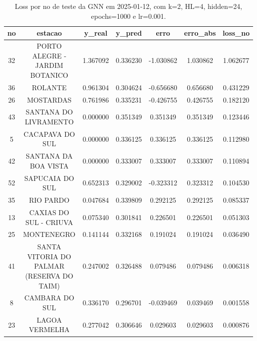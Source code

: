 \begin{table}[h]
\centering
\caption{Loss por no de teste da GNN em 2025-01-12, com k=2, HL=4, hidden=24, epochs=1000 e lr=0.001.}
\label{tab:gnn_loss_k2_hl4_h24_e1000_d20250112}
\begin{tabular}{ccccccc}
\toprule
no & estacao & y\_real & y\_pred & erro & erro\_abs & loss\_no \\
\midrule
32 & PORTO ALEGRE - JARDIM BOTANICO & 1.367092 & 0.336230 & -1.030862 & 1.030862 & 1.062677 \\
36 & ROLANTE & 0.961304 & 0.304624 & -0.656680 & 0.656680 & 0.431229 \\
26 & MOSTARDAS & 0.761986 & 0.335231 & -0.426755 & 0.426755 & 0.182120 \\
43 & SANTANA DO LIVRAMENTO & 0.000000 & 0.351349 & 0.351349 & 0.351349 & 0.123446 \\
5 & CACAPAVA DO SUL & 0.000000 & 0.336125 & 0.336125 & 0.336125 & 0.112980 \\
42 & SANTANA DA BOA VISTA & 0.000000 & 0.333007 & 0.333007 & 0.333007 & 0.110894 \\
52 & SAPUCAIA DO SUL & 0.652313 & 0.329002 & -0.323312 & 0.323312 & 0.104530 \\
35 & RIO PARDO & 0.047684 & 0.339809 & 0.292125 & 0.292125 & 0.085337 \\
13 & CAXIAS DO SUL - CRIUVA & 0.075340 & 0.301841 & 0.226501 & 0.226501 & 0.051303 \\
25 & MONTENEGRO & 0.141144 & 0.332168 & 0.191024 & 0.191024 & 0.036490 \\
41 & SANTA VITORIA DO PALMAR (RESERVA DO TAIM) & 0.247002 & 0.326488 & 0.079486 & 0.079486 & 0.006318 \\
8 & CAMBARA DO SUL & 0.336170 & 0.296701 & -0.039469 & 0.039469 & 0.001558 \\
23 & LAGOA VERMELHA & 0.277042 & 0.306646 & 0.029603 & 0.029603 & 0.000876 \\
\bottomrule
\end{tabular}
\end{table}

